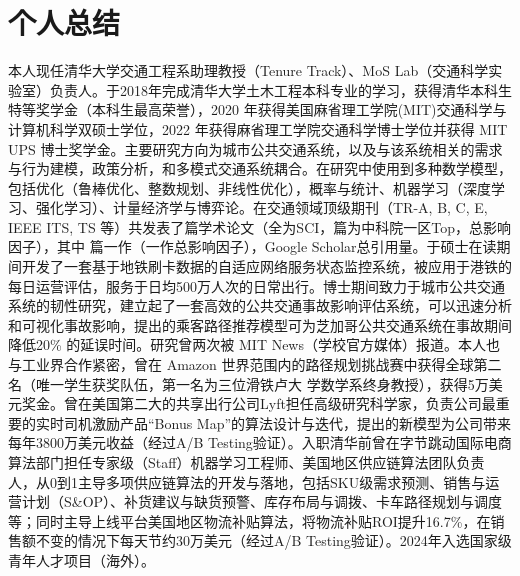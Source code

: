 \section{个人总结}
本人现任清华大学交通工程系助理教授（Tenure Track）、MoS Lab（交通科学实验室）负责人。于2018年完成清华大学土木工程本科专业的学习，获得清华本科生特等奖学金（本科生最高荣誉），2020 年获得美国麻省理工学院(MIT)交通科学与计算机科学双硕士学位，2022 年获得麻省理工学院交通科学博士学位并获得 MIT UPS 博士奖学金。主要研究方向为城市公共交通系统，以及与该系统相关的需求与行为建模，政策分析，和多模式交通系统耦合。在研究中使用到多种数学模型，包括优化（鲁棒优化、整数规划、非线性优化），概率与统计、机器学习（深度学习、强化学习）、计量经济学与博弈论。在交通领域顶级期刊（TR-A, B, C, E, IEEE ITS, TS 等）共发表了\textbf{{\themyCounterNum}}篇学术论文（全为SCI，\textbf{\topnum}篇为中科院一区Top，总影响因子\totalif），其中\textbf{{\themyFirstAuthorNum}} 篇一作（一作总影响因子\firstauthorif），Google Scholar总引用量\textbf{\totalcitation}。于硕士在读期间开发了一套基于地铁刷卡数据的自适应网络服务状态监控系统，被应用于港铁的每日运营评估，服务于日均500万人次的日常出行。博士期间致力于城市公共交通系统的韧性研究，建立起了一套高效的公共交通事故影响评估系统，可以迅速分析和可视化事故影响，提出的乘客路径推荐模型可为芝加哥公共交通系统在事故期间降低20\% 的延误时间。研究曾两次被 MIT News（学校官方媒体）报道。本人也与工业界合作紧密，曾在 Amazon 世界范围内的路径规划挑战赛中获得全球第二名（唯一学生获奖队伍，第一名为三位滑铁卢大 学数学系终身教授），获得5万美元奖金。曾在美国第二大的共享出行公司Lyft担任高级研究科学家，负责公司最重要的实时司机激励产品“Bonus Map”的算法设计与迭代，提出的新模型为公司带来每年3800万美元收益（经过A/B Testing验证）。入职清华前曾在字节跳动国际电商算法部门担任专家级（Staff）机器学习工程师、美国地区供应链算法团队负责人，从0到1主导多项供应链算法的开发与落地，包括SKU级需求预测、销售与运营计划（S\&OP）、补货建议与缺货预警、库存布局与调拨、卡车路径规划与调度等；同时主导上线平台美国地区物流补贴算法，将物流补贴ROI提升16.7\%，在销售额不变的情况下每天节约30万美元（经过A/B Testing验证）。2024年入选国家级青年人才项目（海外）。
% 
